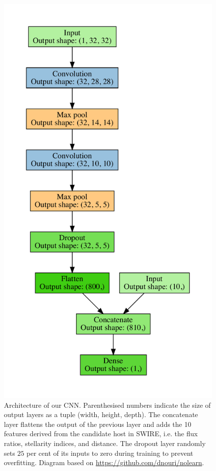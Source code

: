     \begin{figure}
      \centering
      \includegraphics[height=0.9\textheight]{atlas-images/cnn_model_graph}
      \caption[Architecture of our CNN.]{Architecture of our CNN. {Parenthesised numbers indicate
      the size of output layers as a tuple (width, height, depth).} The
      concatenate layer flattens the output of the previous layer and adds the
      10 features derived from the candidate host in SWIRE, i.e. the flux
      ratios, stellarity indices, and distance. The dropout layer randomly
      sets $25$ per cent of its inputs to zero during training to prevent
      overfitting. Diagram based on \url{ https://github.com/dnouri/nolearn}.}
      \label{fig:cnn}
    \end{figure}

